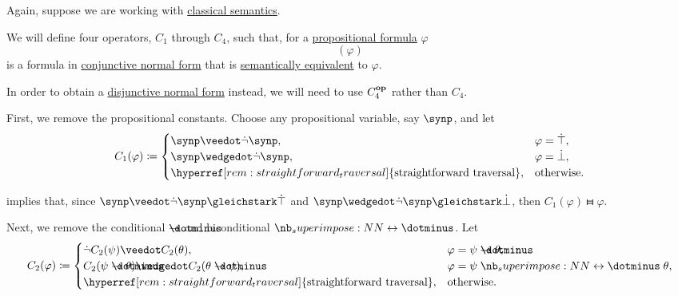 \begin{algorithm}\label{alg:cnf_and_dnf}
  Again, suppose we are working with \hyperref[def:propositional_semantics/classical]{classical semantics}.

  We will define four operators, \( C_1 \) through \( C_4 \), such that, for a \hyperref[def:propositional_syntax/formula]{propositional formula} \( \varphi \)
  \begin{equation*}
    [C_4 \bincirc C_3 \bincirc C_2 \bincirc C_1](\varphi)
  \end{equation*}
  is a formula in \hyperref[def:cnf_and_dnf]{conjunctive normal form} that is \hyperref[def:semantic_equivalence]{semantically equivalent} to \( \varphi \).

  In order to obtain a \hyperref[def:cnf_and_dnf]{disjunctive normal form} instead, we will need to use \( C_4^\oppos \) rather than \( C_4 \).

  \begin{thmenum}
     First, we remove the propositional constants. Choose any propositional variable, say \( \synp \), and let
    \begin{equation*}
      C_1(\varphi) \coloneqq \begin{cases}
        \synp \synvee \synneg \synp,                                             &\varphi = \syntop, \\
        \synp \synwedge \synneg \synp,                                           &\varphi = \synbot, \\
        \hyperref[rem:straightforward_traversal]{\T{straightforward traversal}}, &\T{otherwise.}
      \end{cases}
    \end{equation*}

     implies that, since \( \synp \synvee \synneg \synp \gleichstark \syntop \) and \( \synp \synwedge \synneg \synp \gleichstark \synbot \), then \( C_1(\varphi) \gleichstark \varphi \).

     Next, we remove the conditional \( \synimplies \) and biconditional \( \syniff \). Let
    \begin{equation*}
      C_2(\varphi) \coloneqq \begin{cases}
        \synneg C_2(\psi) \synvee C_2(\theta),                                   &\varphi = \psi \synimplies \theta, \\
        C_2(\psi \synimplies \theta) \synwedge C_2(\theta \synimplies \psi),     &\varphi = \psi \syniff \theta, \\
        \hyperref[rem:straightforward_traversal]{\T{straightforward traversal}}, &\T{otherwise.}
      \end{cases}
    \end{equation*}


\end{thmenum}
\end{algorithm}
